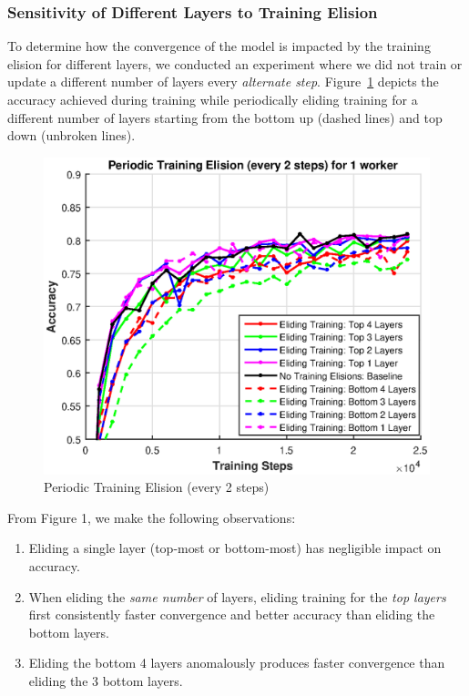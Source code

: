 \subsubsection{Sensitivity of Different Layers to Training Elision}
To determine how the convergence of the model is impacted by the training elision for different layers, we conducted an experiment where we did not train or update a different number of layers every \emph{alternate step}. Figure~\ref{fig:fig1} depicts the accuracy achieved during training while periodically eliding training for a different number of layers starting from the bottom up (dashed lines) and top down (unbroken lines). 
\begin{figure}[t]
	\centering
	\includegraphics[width=0.8\columnwidth]{figures/fig1.eps}
	\caption{Periodic Training Elision (every 2 steps)}
	\label{fig:fig1}
\end{figure}
From Figure 1, we make the following observations: 
\begin{enumerate}
\item Eliding a single layer (top-most or bottom-most) has negligible impact on accuracy.
\item When eliding the \emph{same number} of layers, eliding training for the \emph{top layers} first consistently faster convergence and better accuracy than eliding the bottom layers.
\item Eliding the bottom 4 layers anomalously produces faster convergence than eliding the 3 bottom layers. 
\end{enumerate}
